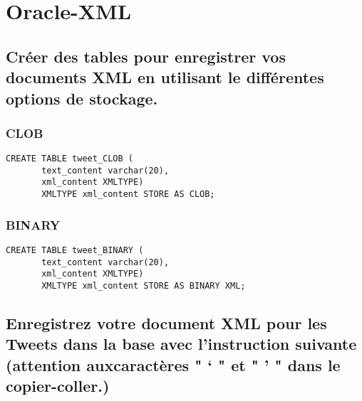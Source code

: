 \chapter{Oracle-XML}
\section{Créer  des  tables  pour  enregistrer  vos  documents  XML  en  utilisant  le  différentes  options  de  stockage.}
\subsection{CLOB}
\begin{verbatim}
CREATE TABLE tweet_CLOB (
       text_content varchar(20),
       xml_content XMLTYPE)
       XMLTYPE xml_content STORE AS CLOB;
\end{verbatim}
       
\subsection{BINARY}
\begin{verbatim}
CREATE TABLE tweet_BINARY (
       text_content varchar(20),
       xml_content XMLTYPE)
       XMLTYPE xml_content STORE AS BINARY XML;
\end{verbatim}

\section{Enregistrez votre document XML pour les Tweets dans la base avec l’instruction suivante (attention auxcaractères " ‘ " et " ’ " dans le copier-coller.)}
